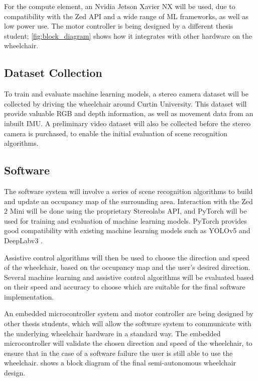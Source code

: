 For the compute element, an Nvidia Jetson Xavier NX will be used, due to compatibility with the Zed API
and a wide range of ML frameworks, as well as low power use.
The motor controller is being designed by a different thesis student; \cref{fig:block_diagram} shows
how it integrates with other hardware on the wheelchair.

\subsection{Dataset Collection}
To train and evaluate machine learning models, a stereo camera dataset will be collected by driving the wheelchair
around Curtin University. This dataset will provide valuable RGB and depth information, as well as movement data
from an inbuilt IMU. A preliminary video dataset will also be collected before the stereo camera is purchased,
to enable the initial evaluation of scene recognition algorithms.

\subsection{Software}
The software system will involve a series of scene recognition algorithms to build and update an occupancy map of the surrounding area.
Interaction with the Zed 2 Mini will be done using the proprietary Stereolabs API, and
PyTorch \cite{paszkePyTorchImperativeStyle2019} will be used for training and evaluation of machine learning models.
PyTorch provides good compatibility with existing machine learning models such as YOLOv5 \cite{ultralyticsYOLOv5} and DeepLabv3 \cite{chenRethinkingAtrousConvolution2017}.

Assistive control algorithms will then be used to choose the direction and speed of the wheelchair, based on the occupancy map and the user's desired direction.
Several machine learning and assistive control algorithms will be evaluated based on their
speed and accuracy to choose which are suitable for the final software implementation.

An embedded microcontroller system and motor controller are being designed by other thesis students,
which will allow the software system to communicate with the underlying wheelchair hardware in a standard way.
The embedded microcontroller will validate the chosen direction and speed of the wheelchair, to ensure
that in the case of a software failure the user is still able to use the wheelchair. 
shows a block diagram of the final semi-autonomous wheelchair design.

